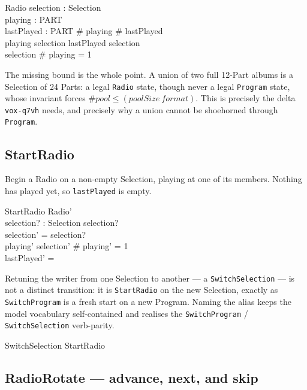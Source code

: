 \documentclass[a4paper,10pt,fleqn]{article}
\begin{document}
\begin{schema}{Radio}
  selection : Selection \\
  playing : \power PART \\
  lastPlayed : \power PART
  \where
  \# playing  \land \# lastPlayed  \\
  playing \subseteq selection \land lastPlayed \subseteq selection \\
  selection \neq \emptyset \implies \# playing = 1
\end{schema}

The missing bound is the whole point. A union of two full 12-Part albums is a
Selection of 24 Parts: a legal \texttt{Radio} state, though never a legal
\texttt{Program} state, whose invariant forces $\# pool \leq (poolSize~format)$.
This is precisely the delta \texttt{vox-q7vh} needs, and precisely why a union
cannot be shoehorned through \texttt{Program}.

\subsection{StartRadio}

Begin a Radio on a non-empty Selection, playing at one of its members. Nothing
has played yet, so \texttt{lastPlayed} is empty.

\begin{schema}{StartRadio}
  Radio' \\
  selection? : Selection
  \where
  selection? \neq \emptyset \\
  selection' = selection? \\
  playing' \subseteq selection' \land \# playing' = 1 \\
  lastPlayed' = \emptyset
\end{schema}

Retuning the writer from one Selection to another --- a
\texttt{SwitchSelection} --- is not a distinct
transition: it is \texttt{StartRadio} on the new Selection, exactly as
\texttt{SwitchProgram} is a fresh start on a new Program. Naming the alias keeps
the model vocabulary self-contained and realises the \texttt{SwitchProgram} /
\texttt{SwitchSelection} verb-parity.

\begin{zed}
  SwitchSelection  StartRadio
\end{zed}

\subsection{RadioRotate --- advance, next, and skip}
\end{document}
